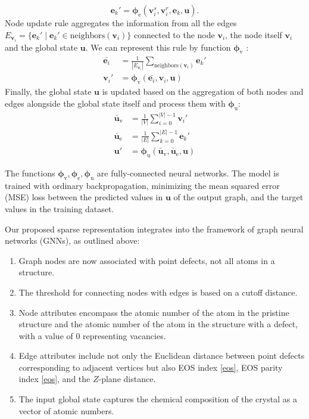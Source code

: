     \begin{equation}
        \mathbf{e}_k' = \mathbf{\phi}_\text{e}(\mathbf{v}_i^s, \mathbf{v}_i^r, \mathbf{e}_k, \mathbf{u}).
    \end{equation}
    Node update rule aggregates the information from all the edges $E_{\mathbf{v}_i}=\{\mathbf{e}_k ' \mid \mathbf{e}_k ' \in \text{neighbors}(\mathbf{v}_i)\}$ connected to the node $\mathbf{v}_i$, the node itself $\mathbf{v}_i$ and the global state $\mathbf{u}$. We can represent this rule by function $\mathbf{\phi}_\text{v}$ :
    \begin{align}
        \bar{\mathbf{e}_i}  &= \frac{1}{|E_{\mathbf{v}_i}|}\sum_{\text{neighbors}(\mathbf{v}_i)}\mathbf{e}_k' \\
        \mathbf{v}_i' &= \mathbf{\phi}_\text{v}(\bar{\mathbf{e}_i}, \mathbf{v}_i, \mathbf{u})
    \end{align}
    Finally, the global state $\mathbf{u}$ is updated based on the aggregation of both nodes and edges alongside the global state itself and process them with $\mathbf{\phi}_\text{u}$:
    \begin{align}
        \bar{\mathbf{u}}_\text{v} & = \frac{1}{|V|} \sum_{i=0}^{|V|-1} \mathbf{v}_i' \\
        \bar{\mathbf{u}}_\text{e} & = \frac{1}{|E|} \sum_{k=0}^{|E|-1} \mathbf{e}_k' \\
        \mathbf{u}'  & = \mathbf{\phi}_\text{u}(\bar{\mathbf{u}}_\text{v}, \bar{\mathbf{u}}_\text{e}, \mathbf{u})
    \end{align}
    
    The functions $\mathbf{\phi}_\text{v}, \mathbf{\phi}_\text{e}, \mathbf{\phi}_\text{u}$ are fully-connected neural networks. The model is trained with ordinary backpropagation, minimizing the mean squared error (MSE) loss between the predicted values in $\mathbf{u}$ of the output graph, and the target values in the training dataset.
    
    
    Our proposed sparse representation integrates into the framework of graph neural networks (GNNs), as outlined above:
    \begin{enumerate}
        \item Graph nodes are now associated with point defects, not all atoms in a structure.
        \item The threshold for connecting nodes with edges is based on a cutoff distance.
        \item Node attributes encompass the atomic number of the atom in the pristine structure and the atomic number of the atom in the structure with a defect, with a value of 0 representing vacancies.
        \item Edge attributes include not only the Euclidean distance between point defects corresponding to adjacent vertices but also EOS index \ref{eos}, EOS parity index \ref{eos}, and the $Z$-plane distance.
        \item The input global state captures the chemical composition of the crystal as a vector of atomic numbers.
    \end{enumerate}
    

